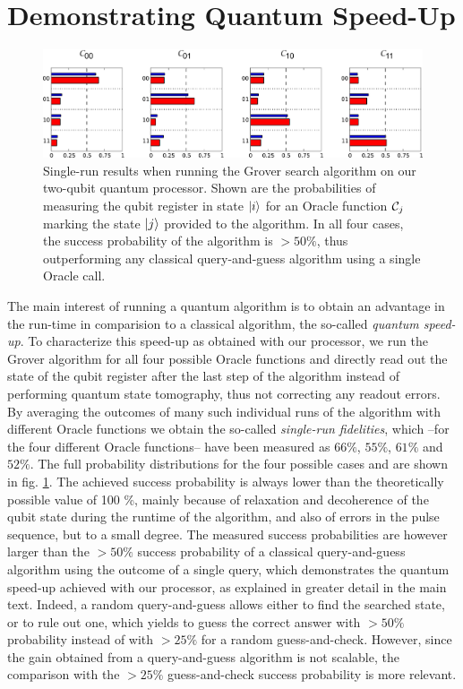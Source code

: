 \section{Demonstrating Quantum Speed-Up}

%
\begin{figure}[ht!]
 \centering \includegraphics[width=1\textwidth]{"./data/ct5/2011_04_21 - grover and tomo/good_data/grover algorithm - single run probabilities"}
\caption[Single-run results of the Grover search algorithm]{Single-run results when running the Grover search algorithm on our
two-qubit quantum processor. Shown are the probabilities of measuring the qubit register in state $\left| i \right>$ for an Oracle function $\Or_j$ marking the state $\left| j \right>$
provided to the algorithm. In all four cases, the success probability
of the algorithm is $>50\%$, thus outperforming any classical query-and-guess
algorithm using a single Oracle call.}


\label{fig:grover_single_shot_probabilities} %
\end{figure}


The main interest of running a quantum algorithm is to obtain an advantage
in the run-time in comparision to a classical algorithm, the so-called
\textit{quantum speed-up}. To characterize this speed-up as obtained
with our processor, we run the Grover algorithm for all four possible
Oracle functions and directly read out the state of the qubit register
after the last step of the algorithm instead of performing quantum
state tomography, thus not correcting any readout errors. By averaging
the outcomes of many such individual runs of the algorithm with different
Oracle functions we obtain the so-called \textit{single-run fidelities},
which --for the four different Oracle functions-- have been measured
as $66\%$, $55\%$, $61\%$ and $52\%$. The full probability distributions
for the four possible cases and are shown in fig.
\ref{fig:grover_single_shot_probabilities}. The achieved success
probability is always lower than the theoretically possible value
of 100 \%, mainly because of relaxation and decoherence of the qubit
state during the runtime of the algorithm, and also of errors in the
pulse sequence, but to a small degree. The measured success probabilities
are however larger than the $>50\%$ success probability of a classical
query-and-guess algorithm using the outcome of a single query, which
demonstrates the quantum speed-up achieved with our processor, as
explained in greater detail in the main text. Indeed, a random query-and-guess
allows either to find the searched state, or to rule out one, which
yields to guess the correct answer with $>50\%$ probability instead
of with $>25\%$ for a random guess-and-check. However, since the
gain obtained from a query-and-guess algorithm is not scalable, the
comparison with the $>25\%$ guess-and-check success probability is
more relevant.


